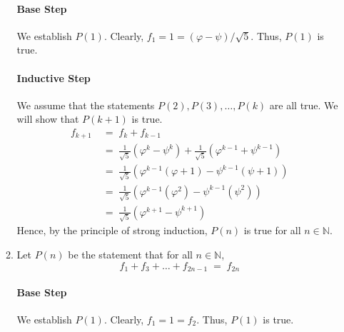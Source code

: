\documentclass[10pt]{article}
\begin{document}
\begin{enumerate}
\begin{enumerate}
                        \paragraph{Base Step}
                        We establish $P(1)$. Clearly, $f_1 = 1 = (\varphi - \psi)/\sqrt{5}$. Thus, $P(1)$ is true.
                        \paragraph{Inductive Step}
                        We assume that the statements $P(2), P(3), \dots, P(k)$ are all true. We will show that $P(k + 1)$ is true.
                        \begin{align*}
                                f_{k + 1} \;&=\; f_{k} + f_{k - 1} \\
                                        \;&=\; \frac{1}{\sqrt{5}}(\varphi^k - \psi^k) + \frac{1}{\sqrt{5}}(\varphi^{k - 1} + \psi^{k - 1}) \\
                                        \;&=\; \frac{1}{\sqrt{5}}(\varphi^{k - 1}(\varphi + 1) - \psi^{k - 1}(\psi + 1)) \\
                                        \;&=\; \frac{1}{\sqrt{5}}(\varphi^{k - 1}(\varphi^2) - \psi^{k - 1}(\psi^2)) \\
                                        \;&=\; \frac{1}{\sqrt{5}}(\varphi^{k + 1} - \psi^{k + 1})
                        \end{align*}
                        Hence, by the principle of strong induction, $P(n)$ is true for all $n \in \mathbb{N}$.
                        
                        \item Let $P(n)$ be the statement that for all $n \in \mathbb{N}$,
                        \[
                        f_1 + f_3 + \dots + f_{2n - 1} \;=\; f_{2n}
                        \]
                        \paragraph{Base Step}
                        We establish $P(1)$. Clearly, $f_1 = 1 = f_2$. Thus, $P(1)$ is true.

\end{enumerate}
\end{enumerate}
\end{document}
